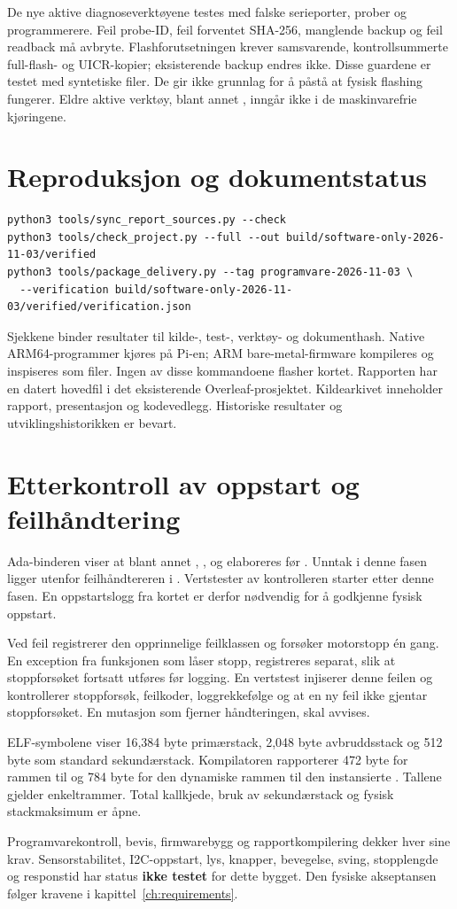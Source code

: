 De nye aktive diagnoseverktøyene testes med falske serieporter,
prober og programmerere. Feil probe-ID, feil forventet SHA-256, manglende
backup og feil readback må avbryte. Flashforutsetningen krever samsvarende,
kontrollsummerte full-flash- og UICR-kopier; eksisterende backup endres
ikke. Disse guardene er testet med syntetiske filer. De gir ikke grunnlag
for å påstå at fysisk flashing fungerer. Eldre aktive verktøy, blant annet
, inngår ikke i de maskinvarefrie kjøringene.

\section{Reproduksjon og dokumentstatus}
\begin{lstlisting}[language={}]
python3 tools/sync_report_sources.py --check
python3 tools/check_project.py --full --out build/software-only-2026-11-03/verified
python3 tools/package_delivery.py --tag programvare-2026-11-03 \
  --verification build/software-only-2026-11-03/verified/verification.json
\end{lstlisting}
Sjekkene binder resultater til kilde-, test-, verktøy- og dokumenthash.
Native ARM64-programmer kjøres på Pi-en; ARM bare-metal-firmware
kompileres og inspiseres som filer. Ingen av disse kommandoene flasher kortet.
Rapporten har en datert hovedfil i det eksisterende Overleaf-prosjektet.
Kildearkivet inneholder rapport, presentasjon og kodevedlegg. Historiske
resultater og utviklingshistorikken er bevart.

\section{Etterkontroll av oppstart og feilhåndtering}
Ada-binderen viser at blant annet ,
,  og
 elaboreres før . Unntak i
denne fasen ligger utenfor feilhåndtereren i \kode{Main}. Vertstester av
kontrolleren starter etter denne fasen. En oppstartslogg fra kortet er
derfor nødvendig for å godkjenne fysisk oppstart.

Ved feil registrerer  den opprinnelige
feilklassen og forsøker motorstopp én gang. En exception fra funksjonen
som låser stopp, registreres separat, slik at stoppforsøket fortsatt
utføres før logging. En vertstest injiserer denne feilen og kontrollerer
stoppforsøk, feilkoder, loggrekkefølge og at en ny feil ikke gjentar
stoppforsøket. En mutasjon som fjerner håndteringen, skal avvises.

ELF-symbolene viser 16,384 byte primærstack, 2,048 byte avbruddsstack
og 512 byte som standard sekundærstack. Kompilatoren rapporterer
472 byte for rammen til \kode{Main} og 784 byte for den dynamiske rammen
til den instansierte \kode{Handle}. Tallene gjelder enkeltrammer.
Total kallkjede, bruk av sekundærstack og fysisk stackmaksimum er åpne.

Programvarekontroll, bevis, firmwarebygg og rapportkompilering dekker
hver sine krav. Sensorstabilitet, I2C-oppstart, lys, knapper, bevegelse,
sving, stopplengde og responstid har status \textbf{ikke testet} for
dette bygget. Den fysiske akseptansen følger kravene i
kapittel~\ref{ch:requirements}.
